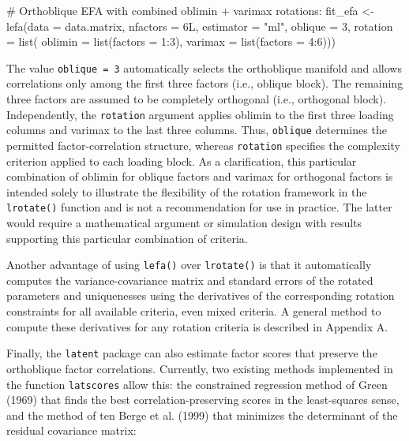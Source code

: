 \documentclass[
  12pt,
  letterpaper,
  article]{scrartcl}
\newenvironment{Shaded}{\begin{snugshade}}{\end{snugshade}}
\newcommand{\AttributeTok}[1]{\textcolor[rgb]{0.40,0.45,0.13}{#1}}
\newcommand{\CommentTok}[1]{\textcolor[rgb]{0.37,0.37,0.37}{#1}}
\newcommand{\DecValTok}[1]{\textcolor[rgb]{0.68,0.00,0.00}{#1}}
\newcommand{\FunctionTok}[1]{\textcolor[rgb]{0.28,0.35,0.67}{#1}}
\newcommand{\NormalTok}[1]{\textcolor[rgb]{0.00,0.23,0.31}{#1}}
\newcommand{\OtherTok}[1]{\textcolor[rgb]{0.00,0.23,0.31}{#1}}
\newcommand{\SpecialCharTok}[1]{\textcolor[rgb]{0.37,0.37,0.37}{#1}}
\newcommand{\StringTok}[1]{\textcolor[rgb]{0.13,0.47,0.30}{#1}}
\begin{document}
\begin{Shaded}
\begin{Highlighting}[]
\CommentTok{\# Orthoblique EFA with combined oblimin + varimax rotations:}
\NormalTok{fit\_efa }\OtherTok{\textless{}{-}} \FunctionTok{lefa}\NormalTok{(}\AttributeTok{data =}\NormalTok{ data.matrix,}
                \AttributeTok{nfactors =} \DecValTok{6}\NormalTok{L,}
                \AttributeTok{estimator =} \StringTok{"ml"}\NormalTok{,}
                \AttributeTok{oblique =} \DecValTok{3}\NormalTok{,}
                \AttributeTok{rotation =} \FunctionTok{list}\NormalTok{(}
                  \AttributeTok{oblimin =} \FunctionTok{list}\NormalTok{(}\AttributeTok{factors =} \DecValTok{1}\SpecialCharTok{:}\DecValTok{3}\NormalTok{),}
                  \AttributeTok{varimax =} \FunctionTok{list}\NormalTok{(}\AttributeTok{factors =} \DecValTok{4}\SpecialCharTok{:}\DecValTok{6}\NormalTok{)))}
\end{Highlighting}
\end{Shaded}

The value \texttt{oblique = 3} automatically selects the orthoblique
manifold and allows correlations only among the first three factors
(i.e., oblique block). The remaining three factors are assumed to be
completely orthogonal (i.e., orthogonal block). Independently, the
\texttt{rotation} argument applies oblimin to the first three loading
columns and varimax to the last three columns. Thus, \texttt{oblique}
determines the permitted factor-correlation structure, whereas
\texttt{rotation} specifies the complexity criterion applied to each
loading block. As a clarification, this particular combination of
oblimin for oblique factors and varimax for orthogonal factors is
intended solely to illustrate the flexibility of the rotation framework
in the \texttt{lrotate()} function and is not a recommendation for use
in practice. The latter would require a mathematical argument or
simulation design with results supporting this particular combination of
criteria.

Another advantage of using \texttt{lefa()} over \texttt{lrotate()} is
that it automatically computes the variance-covariance matrix and
standard errors of the rotated parameters and uniquenesses using the
derivatives of the corresponding rotation constraints for all available
criteria, even mixed criteria. A general method to compute these
derivatives for any rotation criteria is described in Appendix A.

Finally, the \texttt{latent} package can also estimate factor scores
that preserve the orthoblique factor correlations. Currently, two
existing methods implemented in the function \texttt{latscores} allow
this: the constrained regression method of Green (1969) that finds the
best correlation-preserving scores in the least-squares sense, and the
method of {ten Berge et al.} (1999) that minimizes the determinant of
the residual covariance matrix:
\end{document}
